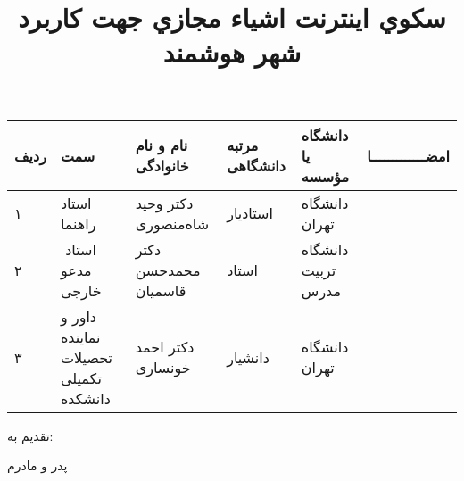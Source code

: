 \subject{مهندسی برق}

\title{سكوي اينترنت اشياء مجازي جهت كاربرد شهر هوشمند}

\blankpage
\firstPage
\blankpage
\besmPage
\blankpage
\firstPage
\blankpage
\davaranPage
\leavevmode\thispagestyle{empty}
\begin{center}
\begin{tabular}{| p{8mm} | p{35mm} | p{} |p{14mm}|p{}|c|}
\hline
ردیف	& سمت                                   & نام و نام خانوادگی    & مرتبه \newline دانشگاهی &	دانشگاه یا مؤسسه   &	امضـــــــــــــا\\
\hline
۱       & استاد راهنما                          & دکتر وحید شاه‌منصوری   & استاد‌یار                & دانشگاه تهران      & \\
\hline
۲       &‌ استاد مدعو خارجی			             & دکتر محمدحسن قاسمیان  & استاد                   & دانشگاه تربیت مدرس & \\
\hline
۳       & داور و نماینده تحصیلات تکمیلی دانشکده	 & دکتر احمد خونساری     & دانشیار                 & دانشگاه تهران      & \\
\hline
\end{tabular}
\end{center}
\esalatPage
\blankpage
\newpage\clearpage


\thispagestyle{empty}
{\Large تقدیم به:}\\
\begin{flushleft}
{\huge
پدر و مادرم
}
\end{flushleft}

